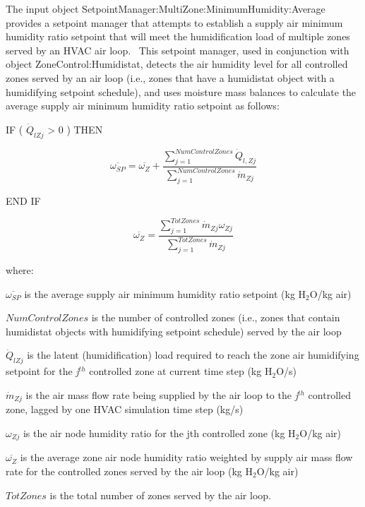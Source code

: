 The input object SetpointManager:MultiZone:MinimumHumidity:Average provides a setpoint manager that attempts to establish a supply air minimum humidity ratio setpoint that will meet the humidification load of multiple zones served by an HVAC air loop.~ This setpoint manager, used in conjunction with object ZoneControl:Humidistat, detects the air humidity level for all controlled zones served by an air loop (i.e., zones that have a humidistat object with a humidifying setpoint schedule), and uses moisture mass balances to calculate the average supply air minimum humidity ratio setpoint as follows:

IF ( \({\dot Q_{lZj}}\) \textgreater{} 0 ) THEN

\begin{equation}
  \overline{{\omega}_{SP}} = \overline{{\omega}_Z} + \frac{\sum\limits_{j = 1}^{NumControlZones}\dot{Q}_{l,Zj}}{\sum\limits_{j = 1}^{NumControlZones}\dot{m}_{Zj}}
\end{equation}

END IF

\begin{equation}
  \overline{{\omega}_{Z}} = \frac{\sum\limits_{j = 1}^{TotZones}\dot{m}_{Zj}\omega_{Zj}}{\sum\limits_{j = 1}^{TotZones}\dot{m}_{Zj}}
\end{equation}

where:

\({\overline{\omega_{SP}}}\) is the average supply air minimum humidity ratio setpoint (kg H\(_{2}\)O/kg air)

\(NumControlZones\) is the number of controlled zones (i.e., zones that contain humidistat objects with humidifying setpoint schedule) served by the air loop

\({\dot Q_{lZj}}\) is the latent (humidification) load required to reach the zone air humidifying setpoint for the \emph{j}\(^{th}\) controlled zone at current time step (kg H\(_{2}\)O/s)

\({\dot m_{Zj}}\) is the air mass flow rate being supplied by the air loop to the \emph{j}\(^{th}\) controlled zone, lagged by one HVAC simulation time step (kg/s)

\({\omega_{Zj}}\) is the air node humidity ratio for the jth controlled zone (kg H\(_{2}\)O/kg air)

\({\overline{\omega_Z}}\) is the average zone air node humidity ratio weighted by supply air mass flow rate for the controlled zones served by the air loop (kg H\(_{2}\)O/kg air)

\(TotZones\) is the total number of zones served by the air loop.

